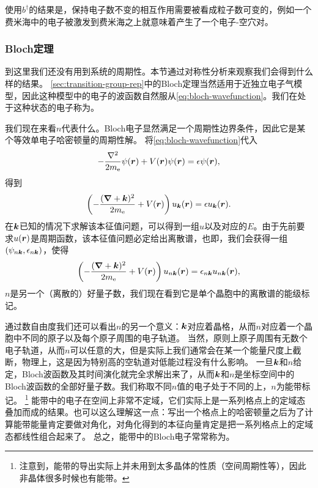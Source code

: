 使用${b}^\dagger$的结果是，保持电子数不变的相互作用需要被看成粒子数可变的，例如一个费米海中的电子被激发到费米海之上就意味着产生了一个电子-空穴对。

\subsubsection{Bloch定理}\label{sec:bloch-electron}

到这里我们还没有用到系统的周期性。本节通过对称性分析来观察我们会得到什么样的结果。
\autoref{sec:transition-group-rep}中的Bloch定理当然适用于近独立电子气模型，因此这种模型中的电子的波函数自然服从\eqref{eq:bloch-wavefunction}。我们在处于这种状态的电子称为。

我们现在来看$n$代表什么。Bloch电子显然满足一个周期性边界条件，因此它是某个等效单电子哈密顿量的周期性解。
将\eqref{eq:bloch-wavefunction}代入
\[
    -\frac{\laplacian}{2m_\text{e}} \psi(\vb*{r}) + V(\vb*{r}) \psi(\vb*{r}) = \epsilon \psi(\vb*{r}),
\]
得到
\begin{equation}
    \left( - \frac{(\grad+\vb*{k})^2}{2m_\text{e}} + V(\vb*{r}) \right) u_{\vb*{k}}(\vb*{r}) = \epsilon u_{\vb*{k}}(\vb*{r}).
    \label{eq:block-energy-problem}
\end{equation}
在$\vb*{k}$已知的情况下求解该本征值问题，可以得到一组$u$以及对应的$E$。由于先前要求$u(\vb*{r})$是周期函数，该本征值问题必定给出离散谱，也即，我们会获得一组$(\psi_{n \vb*{k}}, \epsilon_{n \vb*{k}})$，使得
\begin{equation}
    \left( - \frac{(\grad+\vb*{k})^2}{2m_\text{e}} + V(\vb*{r}) \right) u_{n \vb*{k}}(\vb*{r}) = \epsilon_{n \vb*{k}} u_{n \vb*{k}}(\vb*{r}),
    \label{eq:eigen-function-bloch-u}
\end{equation}
$n$是另一个（离散的）好量子数，我们现在看到它是单个晶胞中的离散谱的能级标记。

通过数自由度我们还可以看出$n$的另一个意义：$\vb*{k}$对应着晶格，从而$n$对应着一个晶胞中不同的原子以及每个原子周围的电子轨道。
当然，原则上原子周围有无数个电子轨道，从而$n$可以任意的大，但是实际上我们通常会在某一个能量尺度上截断，物理上，这是因为特别高的空轨道对低能过程没有什么影响。
一旦$\vb*{k}$和$n$给定，Bloch波函数及其时间演化就完全求解出来了，从而$\vb*{k}$和$n$是坐标空间中的Bloch波函数的全部好量子数。我们称取不同$n$值的电子处于不同的上，$n$为能带标记。%
\footnote{注意到，能带的导出实际上并未用到太多晶体的性质（空间周期性等），因此非晶体很多时候也有能带。}%
能带中的电子在空间上非常不定域，它们实际上是一系列格点上的定域态叠加而成的结果。也可以这么理解这一点：写出一个格点上的哈密顿量之后为了计算能带能量肯定要做对角化，对角化得到的本征向量肯定是把一系列格点上的定域态都线性组合起来了。
总之，能带中的Bloch电子常常称为。

